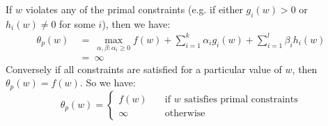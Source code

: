 \documentclass{article}
\begin{document}
If $w$ violates any of the primal constraints (e.g. if either $g_i(w)>0$ or $h_i(w)\neq0$ for some $i$), then we have:
\begin{align*}
\theta_p(w)\ &=\ \max_{\alpha,\beta:\alpha_i\geq0}f(w)+\sum_{i=1}^k\alpha_ig_i(w)+\sum_{i=1}^l\beta_ih_i(w) \\
             &=\ \infty
\end{align*}
Conversely if all constraints are satisfied for a particular value of $w$, then $\theta_p(w)=f(w)$.
So we have:
\begin{equation*}
\theta_p(w)=\begin{cases}
f(w)\quad &\text{if $w$ satisfies primal constraints} \\
\infty    &\text{otherwise}
\end{cases}
\end{equation*}
\end{document}

